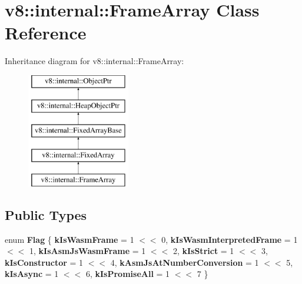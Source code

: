 \hypertarget{classv8_1_1internal_1_1FrameArray}{}\section{v8\+:\+:internal\+:\+:Frame\+Array Class Reference}
\label{classv8_1_1internal_1_1FrameArray}
Inheritance diagram for v8\+:\+:internal\+:\+:Frame\+Array\+:\begin{figure}[H]
\begin{center}
\leavevmode
\includegraphics[height=5.000000cm]{classv8_1_1internal_1_1FrameArray}
\end{center}
\end{figure}
\subsection*{Public Types}
\begin{DoxyCompactItemize}
\item 
\mbox{\label{classv8_1_1internal_1_1FrameArray_a4466449869b97b4a8272906f8f475f90}} 
enum {\bfseries Flag} \{ \newline
{\bfseries k\+Is\+Wasm\+Frame} = 1 $<$$<$ 0, 
{\bfseries k\+Is\+Wasm\+Interpreted\+Frame} = 1 $<$$<$ 1, 
{\bfseries k\+Is\+Asm\+Js\+Wasm\+Frame} = 1 $<$$<$ 2, 
{\bfseries k\+Is\+Strict} = 1 $<$$<$ 3, 
\newline
{\bfseries k\+Is\+Constructor} = 1 $<$$<$ 4, 
{\bfseries k\+Asm\+Js\+At\+Number\+Conversion} = 1 $<$$<$ 5, 
{\bfseries k\+Is\+Async} = 1 $<$$<$ 6, 
{\bfseries k\+Is\+Promise\+All} = 1 $<$$<$ 7
 \}
\end{DoxyCompactItemize}
